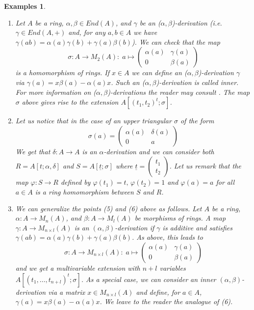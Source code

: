\documentclass[12pt,a4paper]{article}
\newtheorem{examples}[theorem]{Examples}
\newcommand{\ut}{\underline{t}}
\begin{document}
\begin{examples}
{\begin{enumerate}
			\item  \label{End R} Let $A$ be a ring, $\alpha,\beta\in End(A)$, and $\gamma$ be an ($\alpha,\beta$)-derivation (i.e. $\gamma \in End(A,+)$ and, for any $a,b\in A$ we have $\gamma(ab)=\alpha(a)\gamma(b)+ \gamma(a)\beta(b)$).  We can check that the map  
			$$
			\sigma: A \longrightarrow M_2(A):\; a \mapsto
			\begin{pmatrix}
				\alpha(a) & \gamma(a) \\
				0 & \beta(a)
			\end{pmatrix} 
			$$
			is a homomorphism of rings.  If $x\in A$ we can define an  ($\alpha,\beta$)-derivation $\gamma$ via 
			$\gamma(a)=x\beta(a)-\alpha(a)x$.  Such an ($\alpha,\beta$)-derivation is called inner.  For more information on ($\alpha,\beta$)-derivations the reader may consult \cite{BCM}.  The map $\sigma$ above gives rise to the extension $A[(t_1,t_2)^t;\sigma]$.
			
			\item Let us notice that in the case of an upper triangular $\sigma$ of the form 
			$$
			\sigma(a)=\begin{pmatrix}
				\alpha(a) & \delta(a) \\
				0 & a
			\end{pmatrix}
			$$
			We get that $\delta:A\longrightarrow A$ is an $\alpha$-derivation and we can
			 consider both $R=A[t;\alpha, \delta]$ and $S=A[\ut; \sigma]$ where $\ut=\begin{pmatrix}
				t_1 \\
				t_2
			\end{pmatrix}$.
		Let us remark that the map $ \varphi : S\rightarrow R$ defined by $\varphi (t_1)=t, \, \varphi(t_2)=1$ and $\varphi (a)=a $ for all $a\in A$ is a ring homomorphism between $S$ and $R$. 
		
		\item We can generalize the points (5) and (6) above 
		as follows.  Let $A$ be a ring, $\alpha: A 
		\longrightarrow M_n(A)$, and $\beta: A 
		\longrightarrow M_l(A)$ be morphisms of rings.  A 
		map $\gamma: A \longrightarrow M_{n\times l}(A)$ is 
		an $(\alpha, \beta)$-derivation if $\gamma$ is 
		additive and satisfies 
		$\gamma(ab)=\alpha(a)\gamma(b)+ \gamma(a)\beta(b)$.  As above, this leads to
		$$
		\sigma: A \longrightarrow M_{n\times l}(A):\; a \mapsto
		\begin{pmatrix}
			\alpha(a) & \gamma(a) \\
			0 & \beta(a)
		\end{pmatrix} 
		$$
    and we get a multivariable extension with $n+l$ variables
    $A[(t_1,\dots, t_{n+l})^t;\sigma]$.  As a special case, 
    we can consider an inner $(\alpha,\beta)$-derivation via 
    a matrix $x\in M_{n \times l}(A)$ and define, for $a\in 
    A$, $\gamma(a)=x\beta(a)-\alpha(a)x$.
    We leave to the reader the analogue of (6).
   \end{enumerate}	
} 
\end{examples}
	
\end{document}

